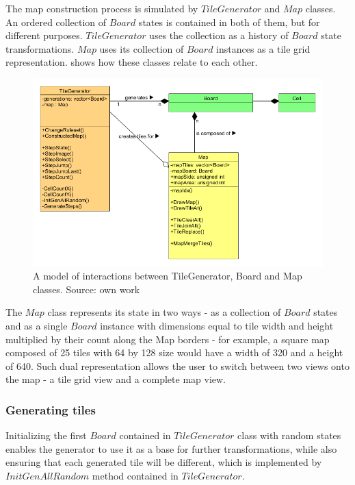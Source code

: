 \documentclass[12pt]{report}
\begin{document}
The map construction process is simulated by $TileGenerator$ and $Map$ classes. An ordered collection of $Board$ states is contained in both of them, but for different purposes. $TileGenerator$ uses the collection as a history of $Board$ state transformations. $Map$ uses its collection of $Board$ instances as a tile grid representation.  shows how these classes relate to each other.

\begin{figure}[h]
	\centering
	\includegraphics[width=0.9\linewidth]{diagrams/tilegenerator_map}
	\caption{ A model of interactions between TileGenerator, Board and Map classes. Source: own work}
	\label{fig:tilegeneratormap}
\end{figure}

The $Map$ class represents its state in two ways - as a collection of $Board$ states and as a single $Board$ instance with dimensions equal to tile width and height multiplied by their count along the Map borders - for example, a square map composed of 25 tiles with 64 by 128 size would have a width of 320 and a height of 640. Such dual representation allows the user to switch between two views onto the map - a tile grid view and a complete map view.

\subsubsection{Generating tiles}

Initializing the first $Board$ contained in $TileGenerator$ class with random states enables the generator to use it as a base for further transformations, while also ensuring that each generated tile will be different, which is implemented by $InitGenAllRandom$ method contained in $TileGenerator$. 
\end{document}
